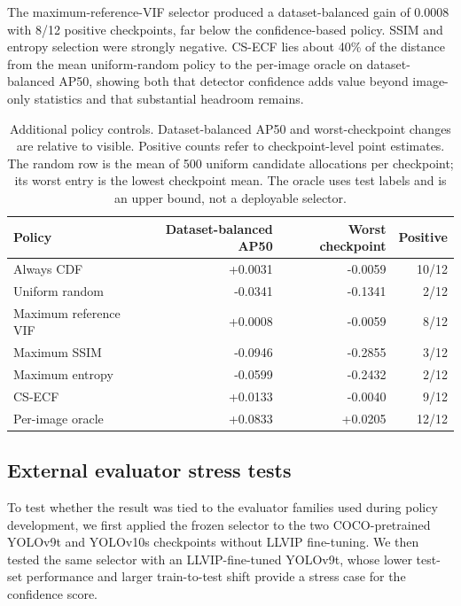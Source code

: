 \documentclass[preprint,11pt]{elsarticle}
\begin{document}
The maximum-reference-VIF selector produced a dataset-balanced gain of 0.0008
with 8/12 positive checkpoints, far below the confidence-based policy.
SSIM and entropy selection were strongly negative. CS-ECF lies about 40\% of
the distance from the mean uniform-random policy to the per-image oracle on
dataset-balanced AP50, showing both that detector confidence adds value beyond
image-only statistics and that substantial headroom remains.

\begin{table}[t]
\centering
\small
\caption{Additional policy controls. Dataset-balanced AP50 and worst-checkpoint
changes are relative to visible. Positive counts refer to checkpoint-level
point estimates. The random row is the mean of 500 uniform candidate
allocations per checkpoint; its worst entry is the lowest checkpoint mean.
The oracle uses test labels and is an upper bound, not a deployable selector.}
\label{tab:baselines}
\begin{tabular}{@{}lrrr@{}}
\toprule
Policy & Dataset-balanced AP50 & Worst checkpoint & Positive \\
\midrule
Always CDF & +0.0031 & -0.0059 & 10/12 \\
Uniform random & -0.0341 & -0.1341 & 2/12 \\
Maximum reference VIF & +0.0008 & -0.0059 & 8/12 \\
Maximum SSIM & -0.0946 & -0.2855 & 3/12 \\
Maximum entropy & -0.0599 & -0.2432 & 2/12 \\
CS-ECF & +0.0133 & -0.0040 & 9/12 \\
Per-image oracle & +0.0833 & +0.0205 & 12/12 \\
\bottomrule
\end{tabular}
\end{table}

\subsection{External evaluator stress tests}

To test whether the result was tied to the evaluator families used during
policy development, we first applied the frozen selector to the two
COCO-pretrained YOLOv9t and YOLOv10s checkpoints without LLVIP fine-tuning.
We then tested the same selector with an LLVIP-fine-tuned YOLOv9t, whose lower
test-set performance and larger train-to-test shift provide a stress case for
the confidence score.
\end{document}
